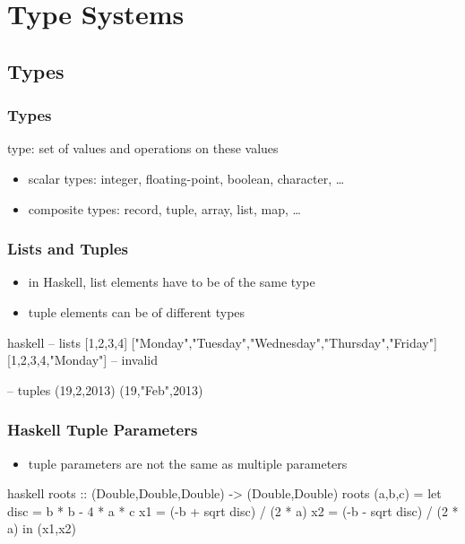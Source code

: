 \documentclass[dvipsnames]{beamer}
\theoremstyle{plain}
\begin{document}
\section{Type Systems}

\subsection{Types}

\begin{frame}
  \frametitle{Types}

  \begin{definition}
    \alert{type}: set of values and operations on these values
  \end{definition}

  \pause
  \medskip
  \begin{itemize}
    \item scalar types: integer, floating-point, boolean, character, \ldots
    \item composite types: record, tuple, array, list, map, \ldots
  \end{itemize}
\end{frame}

\begin{frame}[fragile]
  \frametitle{Lists and Tuples}

  \begin{itemize}
    \item in Haskell, list elements have to be of the same type
    \item tuple elements can be of different types
  \end{itemize}

  \begin{example}[Haskell]
    \begin{pygments}{haskell}
-- lists
[1,2,3,4]
["Monday","Tuesday","Wednesday","Thursday","Friday"]
[1,2,3,4,"Monday"]  -- invalid

-- tuples
(19,2,2013)
(19,"Feb",2013)
    \end{pygments}
  \end{example}
\end{frame}

\begin{frame}[fragile]
  \frametitle{Haskell Tuple Parameters}

  \begin{itemize}
    \item tuple parameters are not the same as multiple parameters
  \end{itemize}

  \begin{example}[Haskell]
    \begin{pygments}{haskell}
roots :: (Double,Double,Double) -> (Double,Double)
roots (a,b,c) =
    let
        disc = b * b - 4 * a * c
        x1 = (-b + sqrt disc) / (2 * a)
        x2 = (-b - sqrt disc) / (2 * a)
    in
        (x1,x2)
    \end{pygments}
  \end{example}
\end{frame}
\end{document}

